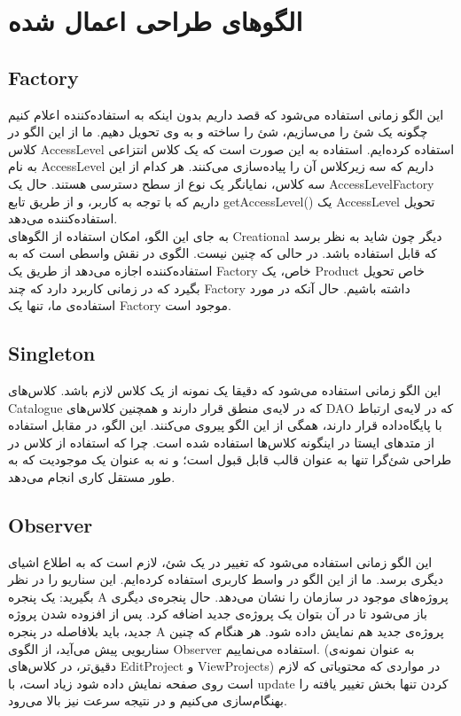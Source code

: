 
\chapter{الگوهای طراحی اعمال شده}

\section{Factory}
این الگو زمانی استفاده می‌شود که قصد داریم بدون اینکه به استفاده‌کننده اعلام کنیم چگونه یک شئ را می‌سازیم، شئ را ساخته و به وی تحویل دهیم. ما از این الگو در کلاس AccessLevel استفاده کرده‌ایم. استفاده به این صورت است که یک کلاس انتزاعی
 به نام AccessLevel داریم که سه زیرکلاس آن را پیاده‌سازی می‌کنند. هر کدام از این سه کلاس، نمایانگر یک نوع از سطح دسترسی هستند. حال یک AccessLevelFactory داریم که با توجه به کاربر،‌ و از طریق تابع getAccessLevel() یک AccessLevel تحویل استفاده‌کننده می‌دهد.\\
 به جای این الگو، امکان استفاده از الگوهای Creational دیگر چون 
 شاید به نظر برسد که قابل استفاده باشد. در حالی که چنین نیست. الگوی
 در نقش واسطی است که به استفاده‌کننده اجازه می‌دهد از طریق یک Factory خاص، یک Product خاص تحویل بگیرد که در زمانی کاربرد دارد که چند Factory داشته باشیم. حال آنکه در مورد استفاده‌ی ما، تنها یک Factory موجود است.


\section{Singleton}
این الگو زمانی استفاده می‌شود که دقیقا یک نمونه از یک کلاس لازم باشد. کلاس‌های Catalogue که در لایه‌ی منطق قرار دارند و همچنین کلاس‌های DAO که در لایه‌ی ارتباط با پایگاه‌داده قرار دارند، همگی از این الگو پیروی می‌کنند. این الگو، در مقابل استفاده از متد‌های ایستا در اینگونه کلاس‌ها استفاده شده است. چرا که استفاده از کلاس در طراحی شئ‌گرا تنها به عنوان قالب قابل قبول است؛ و نه به عنوان یک موجودیت که به طور مستقل کاری انجام می‌دهد.


\section{Observer}
این الگو زمانی استفاده می‌شود که تغییر در یک شئ، لازم است که به اطلاع اشیای دیگری برسد. ما از این الگو در واسط کاربری استفاده کرده‌ایم. این سناریو را در نظر بگیرید: یک پنجره  A پروژه‌های موجود در سازمان را نشان می‌دهد. حال پنجره‌ی دیگری باز می‌شود تا در آن بتوان یک پروژه‌ی جدید اضافه کرد. پس از افزوده شدن پروژه جدید، باید بلافاصله در پنجره A پروژه‌ی جدید هم نمایش داده شود. هر هنگام که چنین سناریویی پیش می‌آید، از الگوی Observer استفاده می‌نماییم. (به عنوان نمونه‌ی دقیق‌تر، در کلاس‌های EditProject و ViewProjects) در مواردی که محتویاتی که لازم است روی صفحه نمایش داده شود زیاد است، با update کردن تنها بخش تغییر یافته را بهنگام‌سازی می‌کنیم و در نتیجه سرعت نیز بالا می‌رود.



